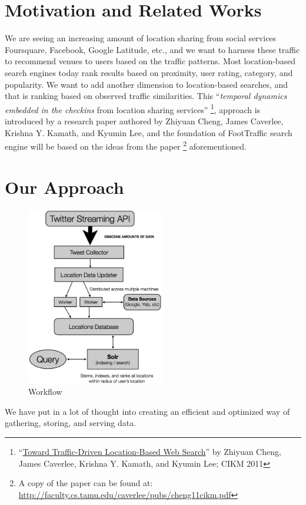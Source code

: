 \documentclass{article}
\begin{document}
%


%
\section{Motivation and Related Works}
We are seeing an increasing amount of location sharing from social services Foursquare, Facebook, Google Latitude, etc.,
and we want to harness these traffic to recommend venues to users based on the traffic patterns. Most location-based
search engines today rank results based on proximity, user rating, category, and popularity. We want to add another 
dimension to location-based searches, and that is ranking based on observed traffic similarities.
This ``\textit{temporal dynamics embedded in the checkins} from location sharing services''
\footnote{``\href{http://faculty.cs.tamu.edu/caverlee/pubs/cheng11cikm.pdf}{Toward Traffic-Driven Location-Based Web Search}''
  by Zhiyuan Cheng, James Caverlee, Krishna Y. Kamath, and Kyumin Lee; CIKM 2011},
approach is introduced by a research paper authored by Zhiyuan Cheng, James Caverlee, Krishna Y. Kamath,
and Kyumin Lee, and the foundation of FootTraffic search engine will be based on the ideas from the paper
\footnote{A copy of the paper can be found at: \url{http://faculty.cs.tamu.edu/caverlee/pubs/cheng11cikm.pdf}}
aforementioned.

\section{Our Approach}
\begin{figure}
\includegraphics[width=6cm]{flowchart.png}
\caption{Workflow}
\end{figure}
We have put in a lot of thought into creating an efficient and optimized way of gathering, storing, and serving data. 
\end{document}
